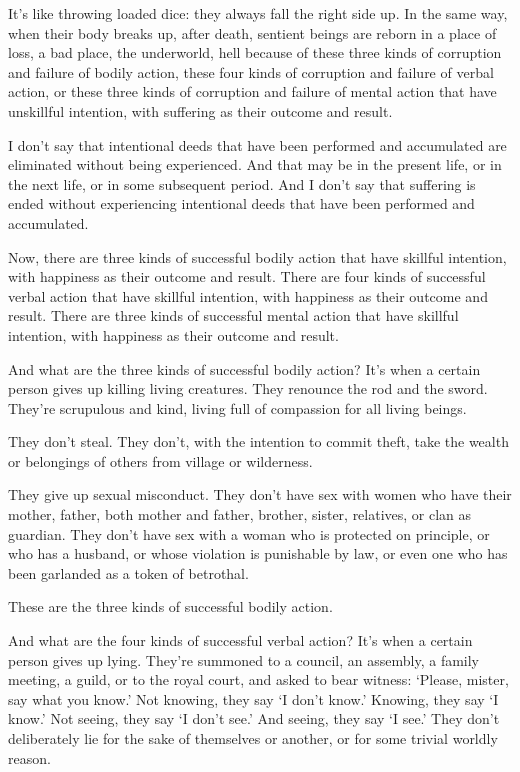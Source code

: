 \documentclass[12pt,openany]{book}%
\begin{document}
It’s like throwing loaded dice: they always fall the right side up. In the same way, when their body breaks up, after death, sentient beings are reborn in a place of loss, a bad place, the underworld, hell because of these three kinds of corruption and failure of bodily action, these four kinds of corruption and failure of verbal action, or these three kinds of corruption and failure of mental action that have unskillful intention, with suffering as their outcome and result. 

I don’t say that intentional deeds that have been performed and accumulated are eliminated without being experienced. And that may be in the present life, or in the next life, or in some subsequent period. And I don’t say that suffering is ended without experiencing intentional deeds that have been performed and accumulated. 

Now, there are three kinds of successful bodily action that have skillful intention, with happiness as their outcome and result. There are four kinds of successful verbal action that have skillful intention, with happiness as their outcome and result. There are three kinds of successful mental action that have skillful intention, with happiness as their outcome and result. 

And what are the three kinds of successful bodily action? It’s when a certain person gives up killing living creatures. They renounce the rod and the sword. They’re scrupulous and kind, living full of compassion for all living beings. 

They don’t steal. They don’t, with the intention to commit theft, take the wealth or belongings of others from village or wilderness. 

They give up sexual misconduct. They don’t have sex with women who have their mother, father, both mother and father, brother, sister, relatives, or clan as guardian. They don’t have sex with a woman who is protected on principle, or who has a husband, or whose violation is punishable by law, or even one who has been garlanded as a token of betrothal. 

These are the three kinds of successful bodily action. 

And what are the four kinds of successful verbal action? It’s when a certain person gives up lying. They’re summoned to a council, an assembly, a family meeting, a guild, or to the royal court, and asked to bear witness: ‘Please, mister, say what you know.’ Not knowing, they say ‘I don’t know.’ Knowing, they say ‘I know.’ Not seeing, they say ‘I don’t see.’ And seeing, they say ‘I see.’ They don’t deliberately lie for the sake of themselves or another, or for some trivial worldly reason. 
\end{document}
